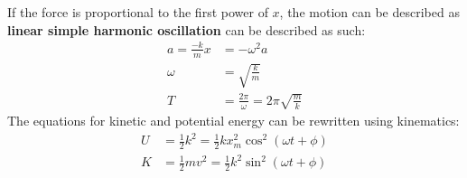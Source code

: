 \documentclass[../AP_Physics_C.tex]{subfiles}
\begin{document}
				If the force is proportional to the first power of $x$, the motion can be described as \textbf{linear simple harmonic oscillation} can be described as such:
				\begin{align*}
					a = \frac{-k}{m}x &= -\omega^2 a \\
					\omega &= \sqrt{\frac{k}{m}} \\
					T &= \frac{2\pi}{\omega} = 2\pi\sqrt{\frac{m}{k}}
				\end{align*}
				The equations for kinetic and potential energy can be rewritten using kinematics:
				\begin{align*}
					U &= \frac{1}{2}k^2 = \frac{1}{2}kx_m^2\cos^2(\omega t + \phi) \\
					K &= \frac{1}{2}mv^2 = \frac{1}{2}k^2\sin^2(\omega t + \phi)
				\end{align*}
\end{document}
